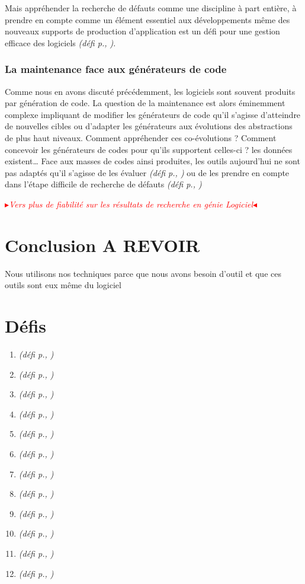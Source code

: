 \documentclass[11pt]{article}
\newcommand{\mynote}[3][black]{\textcolor{#1}{\fbox{\bfseries\sffamily\scriptsize{#2}}
{\small$\blacktriangleright$\textsf{\emph{#3}}$\blacktriangleleft$}}}
\newcommand{\TODO}[1]{\mynote[red]{TODO}{#1}}
\newcommand{\defi}[1]{\emph{(défi p.\pageref{#1}, \cite{#1})}}
\begin{document}
Mais appréhender la recherche de défauts comme une discipline à part entière, à prendre en compte comme un élément essentiel aux développements même des nouveaux supports de production d'application est un défi pour une gestion efficace des logiciels \defi{debugger}.

\subsubsection{La maintenance face aux générateurs de code \label{ss:maintenance:debugger}}
Comme nous en avons discuté précédemment, les logiciels sont souvent produits par génération de code. La question de la maintenance est alors éminemment complexe impliquant de modifier les générateurs de code qu'il s'agisse d'atteindre de nouvelles cibles ou d'adapter les générateurs aux évolutions des abstractions de plus haut niveaux. Comment appréhender ces co-évolutions ? Comment concevoir les générateurs de codes pour qu'ils supportent celles-ci ? les données existent… 
Face aux masses de codes ainsi produites, les outils aujourd'hui ne sont pas adaptés qu'il s'agisse de les évaluer \defi{coevolution} ou de les prendre en compte dans l'étape difficile de recherche de défauts \defi{debugger}


\TODO{Vers plus de fiabilité sur les résultats de recherche en génie Logiciel}

\section{Conclusion A REVOIR}
Nous utilisons nos techniques parce que nous avons besoin d'outil et que ces outils sont eux même du logiciel



\section*{Défis}
\begin{enumerate}
\item \defi{combinatoire}
\item \defi{vert}
\item \defi{GLE}
\item \defi{debuggers}
\item \defi{securite}
\item \defi{coevolution}
\item \defi{compilation}
\item \defi{reconfiguration}
\item \defi{argumentation}
\item \defi{IA}
\item \defi{Monniaux}
\item \defi{formelle}
\end{enumerate}
\end{document}
